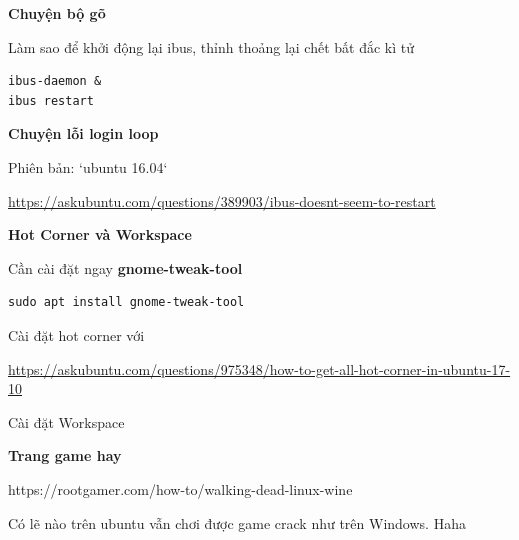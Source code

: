\textbf{Chuyện bộ gõ}

Làm sao để khởi động lại ibus, thỉnh thoảng lại chết bất đắc kì tử

\begin{lstlisting}
ibus-daemon &
ibus restart
\end{lstlisting}

\textbf{Chuyện lỗi login loop}

Phiên bản: `ubuntu 16.04`



\href{https://askubuntu.com/questions/389903/ibus-doesnt-seem-to-restart}{https://askubuntu.com/questions/389903/ibus-doesnt-seem-to-restart}

\textbf{Hot Corner và Workspace}

Cần cài đặt ngay \textbf{gnome-tweak-tool}

\begin{lstlisting}
sudo apt install gnome-tweak-tool
\end{lstlisting}

Cài đặt hot corner với

\href{https://askubuntu.com/questions/975348/how-to-get-all-hot-corner-in-ubuntu-17-10}{https://askubuntu.com/questions/975348/how-to-get-all-hot-corner-in-ubuntu-17-10}

Cài đặt Workspace

\textbf{Trang game hay}

https://rootgamer.com/how-to/walking-dead-linux-wine

Có lẽ nào trên ubuntu vẫn chơi được game crack như trên Windows. Haha
